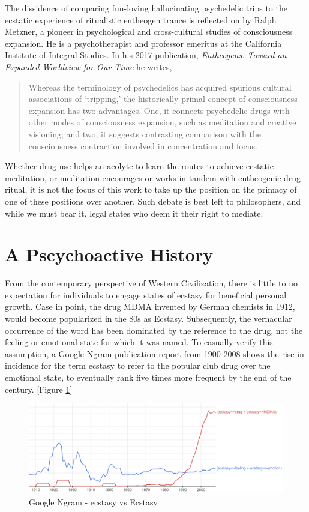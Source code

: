 \documentclass{UIdahoMastersThesis}
\begin{document}
The dissidence of comparing fun-loving hallucinating psychedelic trips to the ecstatic experience of ritualistic entheogen trance is reflected on by Ralph Metzner, a pioneer in psychological and cross-cultural studies of consciousness expansion. He is a psychotherapist and professor emeritus at the California Institute of Integral Studies. In his 2017 publication, \emph{Entheogens: Toward an Expanded Worldview for Our Time} he writes,

\begin{quote}
{Whereas the terminology of psychedelics has acquired spurious cultural associations of `tripping,' the historically primal concept of consciousness expansion has two advantages. One, it connects psychedelic drugs with other modes of consciousness expansion, such as meditation and creative visioning; and two, it suggests contrasting comparison with the consciousness contraction involved in concentration and focus.}\cite{metzner_entheogenesis:_2017}
\end{quote}

Whether drug use helps an acolyte to learn the routes to achieve ecstatic meditation, or meditation encourages or works in tandem with entheogenic drug ritual, it is not the focus of this work to take up the position on the primacy of one of these positions over another. Such debate is best left to philosophers, and while we must bear it, legal states who deem it their right to mediate.

\section{A Pscychoactive History}

From the contemporary perspective of Western Civilization, there is little to no expectation for individuals to engage states of ecstasy for beneficial personal growth. Case in point, the drug MDMA invented by German chemists in 1912, would become popularized in the 80s as Ecstasy. Subsequently, the vernacular occurrence of the word has been dominated by the reference to the drug, not the feeling or emotional state for which it was named. To casually verify this assumption, a Google Ngram publication report from 1900-2008 shows the rise in incidence for the term ecstasy to refer to the popular club drug over the emotional state, to eventually rank five times more frequent by the end of the  century. [Figure \ref{fig:ngram}]

\begin{figure}[h!]
	\centering
	\includegraphics[width=\linewidth]{ecstasy_ngram.png}
	\caption{Google Ngram - ecstasy vs Ecstasy}
	\label{fig:ngram}
\end{figure}
\end{document}
